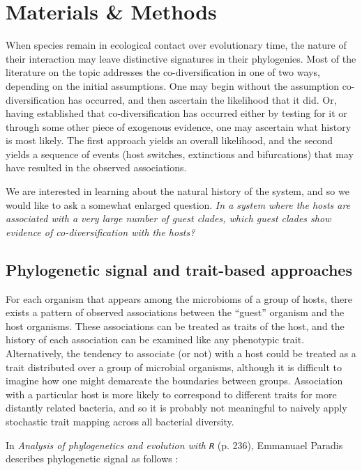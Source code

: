 \section{Materials \& Methods}

When species remain in ecological contact over evolutionary time, the nature of their interaction may leave distinctive signatures in their phylogenies. \cite{bastolla2009architecture} Most of the literature on the topic addresses the co-diversification in one of two ways, depending on the initial assumptions. One may begin without the assumption co-diversification has occurred, and then ascertain the likelihood that it did. Or, having established that co-diversification has occurred either by testing for it or through some other piece of exogenous evidence, one may ascertain what history is most likely. The first approach yields an overall likelihood, and the second yields a sequence of events (host switches, extinctions and bifurcations) that may have resulted in the observed associations.

We are interested in learning about the natural history of the system, and so we would like to ask a somewhat enlarged question. {\em In a system where the hosts are associated with a very large number of guest clades, which guest clades show evidence of co-diversification with the hosts?}

\subsection{Phylogenetic signal and trait-based approaches}

For each organism that appears among the microbioms of a group of hosts, there exists a pattern of observed associations between the ``guest'' organism and the host organisms. These associations can be treated as traits of the host, and the history of each association can be examined like any phenotypic trait. Alternatively, the tendency to associate (or not) with a host could be treated as a trait distributed over a group of microbial organisms, although it is difficult to imagine how one might demarcate the boundaries between groups. Association with a particular host is more likely to correspond to different traits for more distantly related bacteria, and so it is probably not meaningful to naively apply stochastic trait mapping across all bacterial diversity.

In {\em Analysis of phylogenetics and evolution with {\tt R}} (p. 236), Emmanuael Paradis describes phylogenetic signal as follows :

